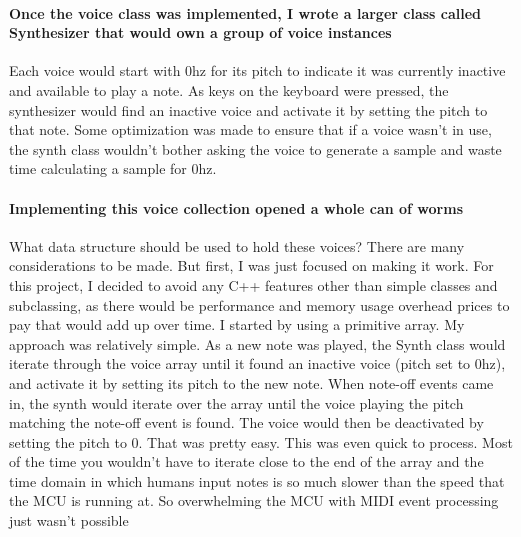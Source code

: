 \documentclass[acmlarge,screen]{acmart}
\begin{document}
	\paragraph{Once the voice class was implemented, I wrote a larger class called Synthesizer that would own a group of voice instances} Each voice would start with 0hz for its pitch to indicate it was currently inactive and available to play a note. As keys on the keyboard were pressed, the synthesizer would find an inactive voice and activate it by setting the pitch to that note. Some optimization was made to ensure that if a voice wasn't in use, the synth class wouldn't bother asking the voice to generate a sample and waste time calculating a sample for 0hz. 
	
	\paragraph{Implementing this voice collection opened a whole can of worms} What data structure should be used to hold these voices? There are many considerations to be made. But first, I was just focused on making it work. For this project, I decided to avoid any C++ features other than simple classes and subclassing, as there would be performance and memory usage overhead prices to pay that would add up over time. I started by using a primitive array. My approach was relatively simple. As a new note was played, the Synth class would iterate through the voice array until it found an inactive voice (pitch set to 0hz), and activate it by setting its pitch to the new note. When note-off events came in, the synth would iterate over the array until the voice playing the pitch matching the note-off event is found. The voice would then be deactivated by setting the pitch to 0. That was pretty easy. This was even quick to process. Most of the time you wouldn't have to iterate close to the end of the array and the time domain in which humans input notes is so much slower than the speed that the MCU is running at. So overwhelming the MCU with MIDI event processing just wasn't possible
\end{document}
